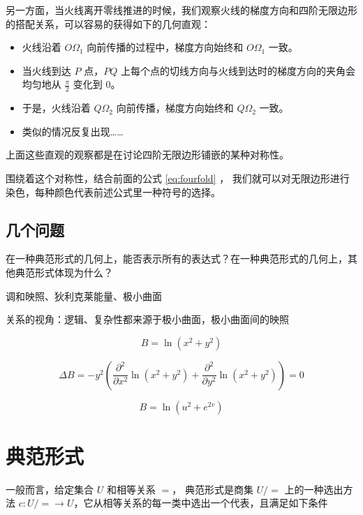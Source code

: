 \documentclass[a4paper,12pt]{article}
\numberwithin{definition}{section}
\numberwithin{lemma}{section}
\numberwithin{proposition}{section}
\numberwithin{theorem}{section}
\numberwithin{grammar}{section}
\numberwithin{program}{section}
\numberwithin{convention}{section}
\numberwithin{corollary}{section}
\begin{document}
另一方面，当火线离开零线推进的时候，我们观察火线的梯度方向和四阶无限边形的搭配关系，可以容易的获得如下的几何直观：

\begin{itemize}
    \item 火线沿着 $O\Omega_{1}$ 向前传播的过程中，梯度方向始终和 $O\Omega_{1}$ 一致。
    \item 当火线到达 $P$ 点，$PQ$ 上每个点的切线方向与火线到达时的梯度方向的夹角会均匀地从 $\frac{\pi}{2}$ 变化到 $0$。
    \item 于是，火线沿着 $Q\Omega_{2}$ 向前传播，梯度方向始终和 $Q\Omega_{2}$ 一致。
    \item 类似的情况反复出现……
\end{itemize}

上面这些直观的观察都是在讨论四阶无限边形铺嵌的某种对称性。

围绕着这个对称性，结合前面的公式 \ref{eq:fourfold} ，
我们就可以对无限边形进行染色，每种颜色代表前述公式里一种符号的选择。

\subsection{几个问题}

在一种典范形式的几何上，能否表示所有的表达式？在一种典范形式的几何上，其他典范形式体现为什么？

调和映照、狄利克莱能量、极小曲面

关系的视角：逻辑、复杂性都来源于极小曲面，极小曲面间的映照

\begin{equation}
   B  = \ln (x^2+ y^2)
\end{equation}

\begin{equation}
\Delta B = - y^2 (\frac{\partial^2}{\partial x^2} \ln (x^2+ y^2) + \frac{\partial^2}{\partial y^2} \ln (x^2+ y^2)) = 0
\end{equation}

\begin{equation}
   B  = \ln (u^2+ e^{2v})
\end{equation}

\newpage

\section{典范形式}\label{sec:canonical}

一般而言，给定集合 $U$ 和相等关系 $=$， 典范形式是商集 $U/=$ 上的一种选出方法 $c: U/= \to U$，它从相等关系的每一类中选出一个代表，且满足如下条件
\end{document}
